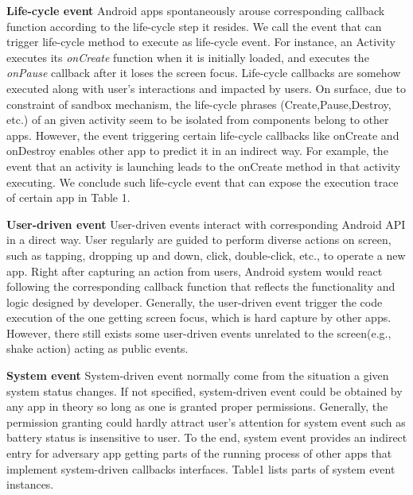 \documentclass{sig-alternate-05-2015}
\begin{document}
\textbf{Life-cycle event} Android apps spontaneously arouse corresponding callback function according to the life-cycle step it resides. We call the event that can trigger life-cycle method to execute as life-cycle event. For instance, an Activity executes its \textit{onCreate} function when it is initially loaded, and executes the \textit{onPause} callback after it loses the screen focus. Life-cycle callbacks are somehow executed along with user's interactions and impacted by users. On surface, due to constraint of sandbox mechanism, the life-cycle phrases (Create,Pause,Destroy, etc.) of an given activity seem to be isolated from components belong to other apps. However, the event triggering certain life-cycle callbacks like onCreate and onDestroy enables other app to predict it in an indirect way. For example, the event that an activity is launching leads to the onCreate method in that activity executing. We conclude such life-cycle event that can expose the execution trace of certain app in Table 1.

\textbf{User-driven event} User-driven events interact with corresponding Android API in a direct way. User regularly are guided to perform diverse actions on screen, such as tapping, dropping up and down, click, double-click, etc., to operate a new app. Right after capturing an action from users, Android system would react following the  corresponding callback function that reflects the functionality and logic designed by developer. Generally, the user-driven event trigger the code execution of the one getting screen focus, which is hard capture by other apps. However, there still exists some user-driven events unrelated to the screen(e.g., shake action) acting as public events. 

\textbf{System event} System-driven event normally come from the situation a given system status changes. If not specified, system-driven event could be obtained by any app in theory so long as one is granted proper permissions. Generally, the permission granting could hardly attract user's attention for system event such as battery status is insensitive to user. To the end, system event provides an indirect entry for adversary app getting parts of the running process of other apps that implement system-driven callbacks interfaces. Table1 lists parts of system event instances.
\end{document}

